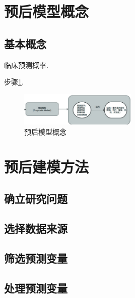 \documentclass{article}
\begin{document}
\title{\TITLE}
\author{\AUTHOR~ \STUDENTNO}
\date{\today}
\maketitle
\thispagestyle{empty}

\begin{abstract}
    本文首先介
    
    \textbf{关键字:} 预后模型，机器学习，智能诊断
\end{abstract}

\newpage
{}
\tableofcontents
\newpage
{}

\section{预后模型概念}
    \subsection{基本概念}
    临床预测概率\cite{chen2020overview}.

    步骤\ref{fig:a}.
    \begin{figure}[h]
        \centering
        \includegraphics[width=0.5\textwidth]{2fig/a.png}
        \caption{预后模型概念}
        \label{fig:a}
    \end{figure}
    
\section{预后建模方法}
    \subsection{确立研究问题}
    
    
    \subsection{选择数据来源}

    \subsection{筛选预测变量}
   
    \subsection{处理预测变量}
    
\end{document}
